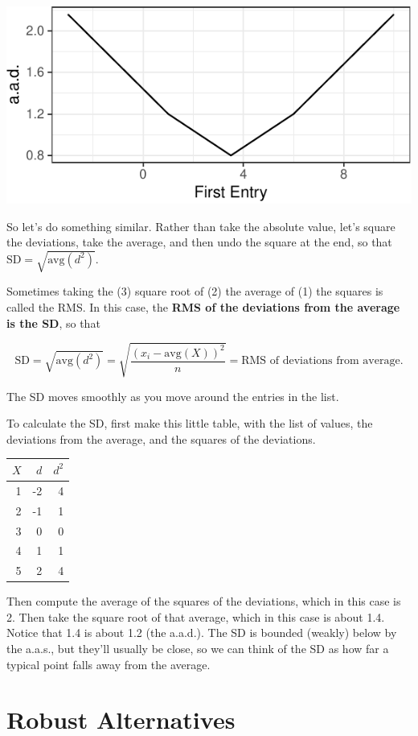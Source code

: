 \documentclass[]{book}
\begin{document}
\includegraphics{concepts-and-computation_files/figure-latex/unnamed-chunk-5-1.pdf}

So let's do something similar. Rather than take the absolute value, let's square the deviations, take the average, and then undo the square at the end, so that \(\text{SD} = \sqrt{\text{avg}(d^2)}\).

Sometimes taking the (3) square root of (2) the average of (1) the squares is called the RMS. In this case, the \textbf{RMS of the deviations from the average is the SD}, so that

\begin{equation}
\text{SD} = \sqrt{\text{avg}(d^2)} = \sqrt{\dfrac{(x_i - \text{avg}(X))^2}{n}} = \text{RMS of deviations from average}. \nonumber
\end{equation}

\noindent The SD moves smoothly as you move around the entries in the list.

To calculate the SD, first make this little table, with the list of values, the deviations from the average, and the squares of the deviations.

\begin{longtable}[]{@{}rrr@{}}
\toprule
\(X\) & \(d\) & \(d^2\)\tabularnewline
\midrule
\endhead
1 & -2 & 4\tabularnewline
2 & -1 & 1\tabularnewline
3 & 0 & 0\tabularnewline
4 & 1 & 1\tabularnewline
5 & 2 & 4\tabularnewline
\bottomrule
\end{longtable}

Then compute the average of the squares of the deviations, which in this case is 2. Then take the square root of that average, which in this case is about 1.4. Notice that 1.4 is about 1.2 (the a.a.d.). The SD is bounded (weakly) below by the a.a.s., but they'll usually be close, so we can think of the SD as how far a typical point falls away from the average.

\hypertarget{robust-alternatives}{%
\section{Robust Alternatives}\label{robust-alternatives}}
\end{document}
